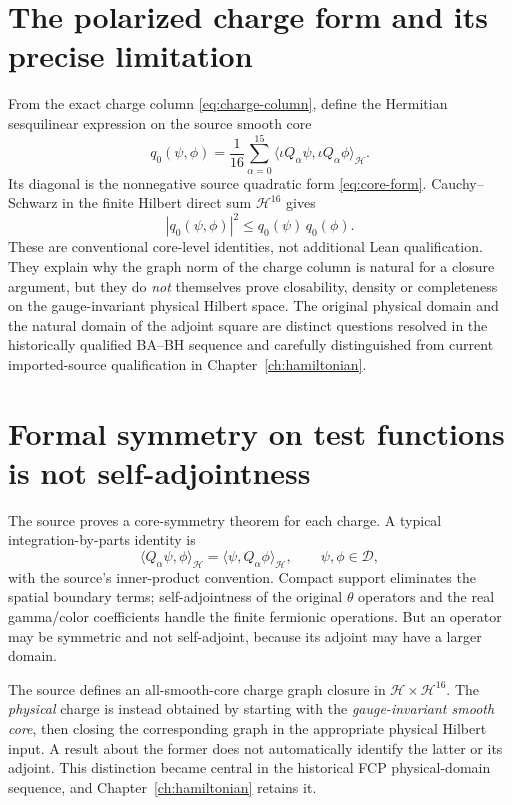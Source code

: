 \section{The polarized charge form and its precise limitation}
From the exact charge column \eqref{eq:charge-column}, define the
Hermitian sesquilinear expression on the source smooth core
\begin{equation}\label{eq:polarized-charge-form}
 q_0(\psi,\phi)=\frac1{16}\sum_{\alpha=0}^{15}
 \langle\iota Q_\alpha\psi,\iota Q_\alpha\phi\rangle_{\mathscr H}.
\end{equation}
Its diagonal is the nonnegative source quadratic form
\eqref{eq:core-form}. Cauchy--Schwarz in the finite Hilbert direct
sum $\mathscr H^{16}$ gives
\begin{equation}\label{eq:polarized-charge-bound}
 |q_0(\psi,\phi)|^2\leq q_0(\psi)\,q_0(\phi).
\end{equation}
These are conventional core-level identities, not additional Lean
qualification. They explain why the graph norm of the charge
column is natural for a closure argument, but they do \emph{not}
themselves prove closability, density or completeness on the
gauge-invariant physical Hilbert space. The original physical domain
and the natural domain of the adjoint square are distinct questions
resolved in the historically qualified BA--BH sequence and carefully
distinguished from current imported-source qualification in
Chapter~\ref{ch:hamiltonian}.

\section{Formal symmetry on test functions is not self-adjointness}
The source proves a core-symmetry theorem for each charge. A typical
integration-by-parts identity is
\begin{equation}\label{eq:core-symmetry}
 \langle Q_\alpha\psi,\phi\rangle_{\mathscr H}
 =\langle\psi,Q_\alpha\phi\rangle_{\mathscr H},
 \qquad\psi,\phi\in\mathscr D,
\end{equation}
with the source's inner-product convention. Compact support eliminates
the spatial boundary terms; self-adjointness of the original $\theta$
operators and the real gamma/color coefficients handle the finite
fermionic operations. But an operator may be symmetric and not
self-adjoint, because its adjoint may have a larger domain.

\begin{remark}
The source defines an all-smooth-core charge graph closure in
$\mathscr H\times\mathscr H^{16}$. The \emph{physical} charge is instead
obtained by starting with the \emph{gauge-invariant smooth core}, then
closing the corresponding graph in the appropriate physical Hilbert
input. A result about the former does not automatically identify the
latter or its adjoint. This distinction became central in the historical
FCP physical-domain sequence, and Chapter~\ref{ch:hamiltonian} retains it.
\end{remark}

